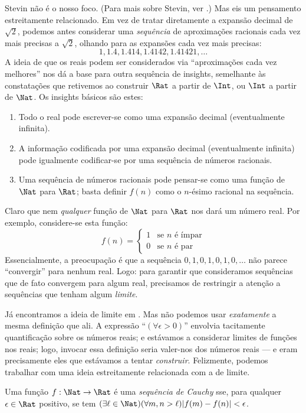 \documentclass[../../../include/open-logic-section]{subfiles}
\begin{document}
Stevin não é o nosso foco. (Para mais sobre Stevin, ver
\citealt{KatzKatz2012}.) Mas eis um pensamento estreitamente relacionado. Em
vez de tratar diretamente a expansão decimal de $\sqrt{2}$, podemos antes
considerar uma \emph{sequência} de aproximações racionais cada vez mais precisas
a $\sqrt{2}$, olhando para as expansões cada vez mais precisas:
\[
1, 1.4, 1.414, 1.4142, 1.41421,\ldots
\]
A ideia de que os reais podem ser considerados via ``aproximações cada vez
melhores'' nos dá a base para outra sequência de insights, semelhante às
constatações que retivemos ao construir $\Rat$ a partir de $\Int$, ou $\Int$ a
partir de $\Nat$. Os insights básicos são estes:
\begin{enumerate}
	\item Todo o real pode escrever-se como uma expansão decimal (eventualmente
	infinita).
	\item A informação codificada por uma expansão decimal (eventualmente
	infinita) pode igualmente codificar-se por uma sequência de números
	racionais.
	\item Uma sequência de números racionais pode pensar-se como uma função de
	$\Nat$ para $\Rat$; basta definir $f(n)$ como o $n$-ésimo racional na
	sequência.
\end{enumerate}
Claro que nem \emph{qualquer} função de $\Nat$ para $\Rat$ nos dará um número
real. Por exemplo, considere-se esta função:
\[
	f(n) =\begin{cases}
			1 & \text{se }n\text{ é ímpar}\\
			0 &\text{se }n\text{ é par}
		\end{cases}
\]
Essencialmente, a preocupação é que a sequência $0,1,0,1,0,1,0,\ldots$
não parece ``convergir'' para nenhum real. Logo: para garantir que consideramos
sequências que de fato convergem para algum real, precisamos de restringir a
atenção a sequências que tenham algum \emph{limite}.

Já encontramos a ideia de limite em
. Mas não podemos usar \emph{exatamente} a mesma
definição que ali. A expressão ``$(\forall \epsilon>0)$''
envolvia tacitamente quantificação sobre os números reais; e estávamos a
considerar limites de funções nos reais; logo, invocar essa definição seria
valer-nos dos números reais --- e eram precisamente eles que estávamos a
tentar \emph{construir}. Felizmente, podemos trabalhar com uma ideia estreitamente
relacionada com a de limite.
\begin{defn}
  Uma função $f: \Nat \to \Rat$ é uma \emph{sequência de Cauchy} sse, para
  qualquer $\epsilon \in \Rat$ positivo, se tem $(\exists \ell \in
  \Nat)(\forall m, n > \ell)|f(m) - f(n)| < \epsilon$.
\end{defn}
\end{document}
